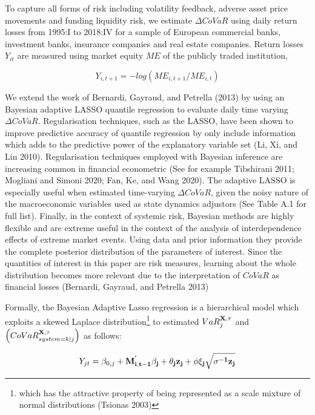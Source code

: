 \documentclass[
  10pt,
]{article}
\begin{document}
To capture all forms of risk including volatility feedback, adverse
asset price movements and funding liquidity risk, we estimate
\(\Delta CoVaR\) using daily return losses from 1995:I to 2018:IV for a
sample of European commercial banks, investment banks, insurance
companies and real estate companies. Return losses \(Y_{it}\) are
measured using market equity \(ME\) of the publicly traded institution,

\begin{equation}\label{eq:eq3}
Y_{i,t+1}=-log(ME_{i,t+1}/ME_{i,t})
\end{equation}

We extend the work of Bernardi, Gayraud, and Petrella (2013) by using an
Bayesian adaptive LASSO quantile regression to evaluate daily time
varying \(\Delta CoVaR\). Regularisation techniques, such as the LASSO,
have been shown to improve predictive accuracy of quantile regression by
only include information which adds to the predictive power of the
explanatory variable set (Li, Xi, and Lin 2010). Regularisation
techniques employed with Bayesian inference are increasing common in
financial econometric (See for example Tibshirani 2011; Mogliani and
Simoni 2020; Fan, Ke, and Wang 2020). The adaptive LASSO is especially
useful when estimated time-varying \(\Delta CoVaR\), given the noisy
nature of the macroeconomic variables used as state dynamics adjustors
(See Table A.1 for full list). Finally, in the context of systemic risk,
Bayesian methods are highly flexible and are extreme useful in the
context of the analysis of interdependence effects of extreme market
events. Using data and prior information they provide the complete
posterior distribution of the parameters of interest. Since the
quantities of interest in this paper are risk measures, learning about
the whole distribution becomes more relevant due to the interpretation
of \(CoVaR\) as financial losses (Bernardi, Gayraud, and Petrella 2013)

Formally, the Bayesian Adaptive Lasso regression is a hierarchical model
which exploits a skewed Laplace distribution\footnote{which has the
  attractive property of being represented as a scale mixture of normal
  distributions (Tsionas 2003)} to estimated \(VaR^{\bf{X},\tau}_j\) and
\(\left( CoVaR_{system=k|j}^{\bf{X},\tau} \right)\) as follows:

\begin{equation}\label{eq:eq4}
Y_{jt}=\beta_{0,j}+\bf{M^{'}_{i,t-1}} \bf{\beta_j} +\theta_j z_j+\phi \xi_j \sqrt{\sigma^{-1}z_j} 
\end{equation}
\end{document}
